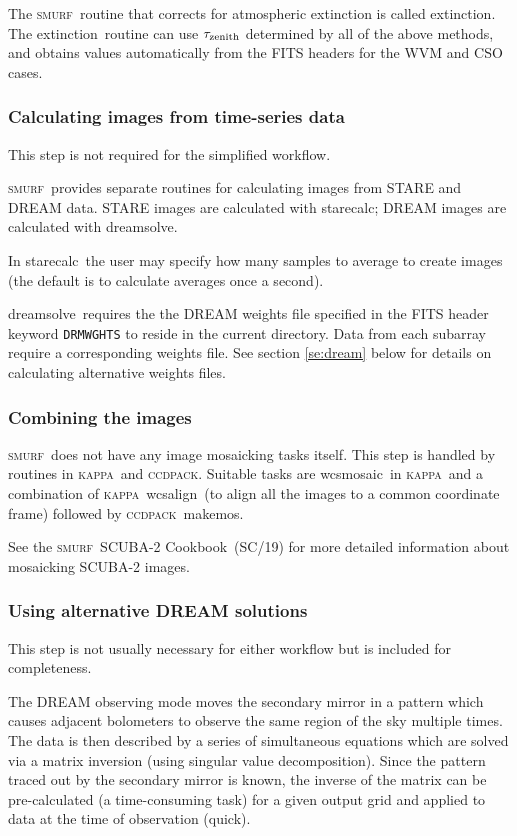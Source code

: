 \documentclass[twoside,11pt]{article}
\newcommand{\xref}[3]{#1}
\newcommand{\xlabel}[1]{}
\renewcommand{\_}{\texttt{\symbol{95}}}
\newcommand{\CCDPACK}{\textsc{ccdpack}}
\newcommand{\KAPPA}{\textsc{kappa}}
\newcommand{\SMURF}{\textsc{smurf}}
\newcommand{\SMURFcook}{\xref{\SMURF\ SCUBA-2 Cookbook}{sc19}{}}
\newcommand{\task}[1]{\textsf{#1}}
\newcommand{\dreamsolve}{\xref{\task{dreamsolve}}{sun258}{DREAMSOLVE}}
\newcommand{\starecalc}{\xref{\task{starecalc}}{sun258}{STARECALC}}
\newcommand{\extinction}{\xref{\task{extinction}}{sun258}{EXTINCTION}}
\newcommand{\makemos}{\xref{\task{makemos}}{sun139}{MAKEMOS}}
\newcommand{\wcsmosaic}{\xref{\task{wcsmosaic}}{sun95}{WCSMOSAIC}}
\newcommand{\wcsalign}{\xref{\task{wcsalign}}{sun95}{WCSALIGN}}
\begin{document}
The \SMURF\ routine that corrects for atmospheric extinction is called
\extinction. The \extinction\ routine can use $\tau_{\rm zenith}$
determined by all of the above methods, and obtains values
automatically from the FITS headers for the WVM and CSO cases.

\subsubsection{\xlabel{dsimages}Calculating images from time-series data\label{se:dsimages}}

This step is not required for the simplified workflow.

\SMURF\ provides separate routines for calculating images from STARE
and DREAM data. STARE images are calculated with \starecalc; DREAM
images are calculated with \dreamsolve. 

In \starecalc\ the user may specify how many samples to average to
create images (the default is to calculate averages once a second).

\dreamsolve\ requires the the DREAM weights file specified in the FITS
header keyword \texttt{DRMWGHTS} to reside in the current
directory. Data from each subarray require a corresponding weights
file. See section \ref{se:dream} below for details on calculating
alternative weights files.

\subsubsection{\xlabel{mosaic}Combining the images\label{se:mosaic}}

\SMURF\ does not have any image mosaicking tasks itself. This step is
handled by routines in \KAPPA\ and \CCDPACK. Suitable tasks are
\wcsmosaic\ in \KAPPA\ and a combination of \KAPPA\ \wcsalign\ (to
align all the images to a common coordinate frame) followed by
\CCDPACK\ \makemos.

See the \SMURFcook\ (SC/19) for more detailed information about
mosaicking SCUBA-2 images.

\subsubsection{\xlabel{dream}Using alternative DREAM solutions\label{se:dream}}

This step is not usually necessary for either workflow but is included
for completeness.

The DREAM observing mode moves the secondary mirror in a pattern which
causes adjacent bolometers to observe the same region of the sky
multiple times. The data is then described by a series of simultaneous
equations which are solved via a matrix inversion (using singular
value decomposition). Since the pattern traced out by the secondary
mirror is known, the inverse of the matrix can be pre-calculated (a
time-consuming task) for a given output grid and applied to data at
the time of observation (quick).
\end{document}
